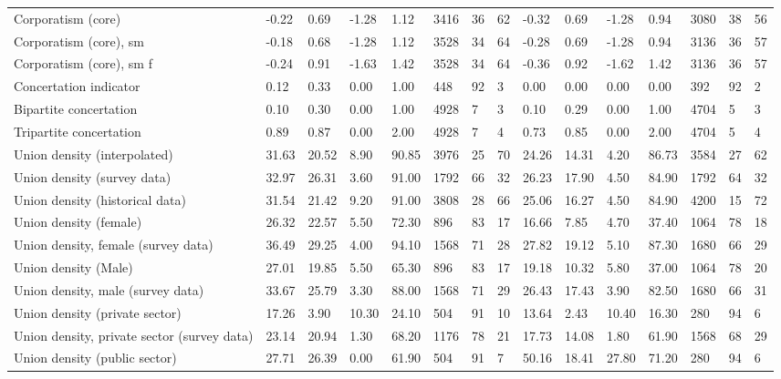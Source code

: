\begin{longtable}{lllllllllllllll}
Corporatism (core) & -0.22 & 0.69 & -1.28 & 1.12 & 3416 & 36 & 62 & -0.32 & 0.69 & -1.28 & 0.94 & 3080 & 38 & 56\\
\addlinespace
Corporatism (core), sm & -0.18 & 0.68 & -1.28 & 1.12 & 3528 & 34 & 64 & -0.28 & 0.69 & -1.28 & 0.94 & 3136 & 36 & 57\\
Corporatism (core), sm f & -0.24 & 0.91 & -1.63 & 1.42 & 3528 & 34 & 64 & -0.36 & 0.92 & -1.62 & 1.42 & 3136 & 36 & 57\\
Concertation indicator & 0.12 & 0.33 & 0.00 & 1.00 & 448 & 92 & 3 & 0.00 & 0.00 & 0.00 & 0.00 & 392 & 92 & 2\\
Bipartite concertation & 0.10 & 0.30 & 0.00 & 1.00 & 4928 & 7 & 3 & 0.10 & 0.29 & 0.00 & 1.00 & 4704 & 5 & 3\\
Tripartite concertation & 0.89 & 0.87 & 0.00 & 2.00 & 4928 & 7 & 4 & 0.73 & 0.85 & 0.00 & 2.00 & 4704 & 5 & 4\\
\addlinespace
Union density (interpolated) & 31.63 & 20.52 & 8.90 & 90.85 & 3976 & 25 & 70 & 24.26 & 14.31 & 4.20 & 86.73 & 3584 & 27 & 62\\
Union density (survey data) & 32.97 & 26.31 & 3.60 & 91.00 & 1792 & 66 & 32 & 26.23 & 17.90 & 4.50 & 84.90 & 1792 & 64 & 32\\
Union density (historical data) & 31.54 & 21.42 & 9.20 & 91.00 & 3808 & 28 & 66 & 25.06 & 16.27 & 4.50 & 84.90 & 4200 & 15 & 72\\
Union density (female) & 26.32 & 22.57 & 5.50 & 72.30 & 896 & 83 & 17 & 16.66 & 7.85 & 4.70 & 37.40 & 1064 & 78 & 18\\
Union density, female (survey data) & 36.49 & 29.25 & 4.00 & 94.10 & 1568 & 71 & 28 & 27.82 & 19.12 & 5.10 & 87.30 & 1680 & 66 & 29\\
\addlinespace
Union density (Male) & 27.01 & 19.85 & 5.50 & 65.30 & 896 & 83 & 17 & 19.18 & 10.32 & 5.80 & 37.00 & 1064 & 78 & 20\\
Union density, male (survey data) & 33.67 & 25.79 & 3.30 & 88.00 & 1568 & 71 & 29 & 26.43 & 17.43 & 3.90 & 82.50 & 1680 & 66 & 31\\
Union density (private sector) & 17.26 & 3.90 & 10.30 & 24.10 & 504 & 91 & 10 & 13.64 & 2.43 & 10.40 & 16.30 & 280 & 94 & 6\\
Union density, private sector (survey data) & 23.14 & 20.94 & 1.30 & 68.20 & 1176 & 78 & 21 & 17.73 & 14.08 & 1.80 & 61.90 & 1568 & 68 & 29\\
Union density (public sector) & 27.71 & 26.39 & 0.00 & 61.90 & 504 & 91 & 7 & 50.16 & 18.41 & 27.80 & 71.20 & 280 & 94 & 6\\

\end{longtable}
